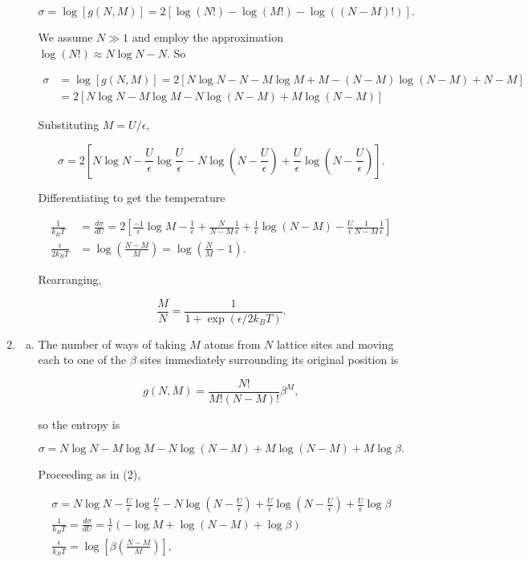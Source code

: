 \documentclass{article}
\begin{document}
\begin{enumerate}
\begin{enumerate}[(a)]
		$$\sigma = \log[g(N,M)] = 2[ \log(N!) - \log(M!) - \log((N-M)!) ].$$

		We assume $N \gg 1$ and employ the approximation $\log (N!) \approx N\log N - N$. So

		\begin{align*}
		\sigma &= \log[g(N,M)] = 2[ N\log N - N - M \log M + M - (N-M) \log (N-M) + N - M] \\
		&= 2[ N\log N - M \log M - N \log (N-M) + M \log (N-M)]
		\end{align*}

		Substituting $M = U/\epsilon$, 

		$$\sigma = 2\left[ N\log N - \frac{U}{\epsilon} \log \frac{U}{\epsilon} - N \log (N- \frac{U}{\epsilon}) + \frac{U}{\epsilon} \log (N- \frac{U}{\epsilon}) \right].$$

		Differentiating to get the temperature

		\begin{align*}
		\frac{1}{k_B T} &= \frac{d\sigma}{dU} = 2 \left[ \frac{-1}{\epsilon} \log M - \frac{1}{\epsilon} + \frac{N}{N - M} \frac{1}{\epsilon} + \frac{1}{\epsilon} \log(N - M) - \frac{U}{\epsilon}\frac{1}{N - M}\frac{1}{\epsilon} \right] \\
		\frac{\epsilon}{2 k_B T} &= \log \left( \frac{N-M}{M} \right) = \log \left( \frac{N}{M} - 1 \right).
		\end{align*}

		Rearranging,

		$$\frac{M}{N} = \frac{1}{1 + \exp(\epsilon / 2 k_B T)}.$$

	\end{enumerate}

	\item

	\begin{enumerate}[(a)]

		\item

		The number of ways of taking $M$ atoms from $N$ lattice sites and moving each to one of the $\beta$ sites immediately surrounding its original position is

		$$g(N,M) = \frac{N!}{M! (N-M)!} \beta^M,$$

		so the entropy is 

		$$\sigma = N\log N - M \log M - N \log (N-M) + M \log (N-M) + M \log \beta.$$

		Proceeding as in (2),

		\begin{gather*}
		\sigma =  N\log N - \frac{U}{\epsilon} \log \frac{U}{\epsilon} - N \log (N- \frac{U}{\epsilon}) + \frac{U}{\epsilon} \log (N- \frac{U}{\epsilon}) + \frac{U}{\epsilon} \log \beta \\
		\frac{1}{k_B T} = \frac{d\sigma}{dU} = \frac{1}{\epsilon} \left( -\log M + \log (N-M) + \log \beta \right) \\
		\frac{\epsilon}{k_B T} = \log \left[ \beta \left( \frac{N-M}{M} \right) \right], 
		\end{gather*}


\end{enumerate}
\end{enumerate}
\end{document}

